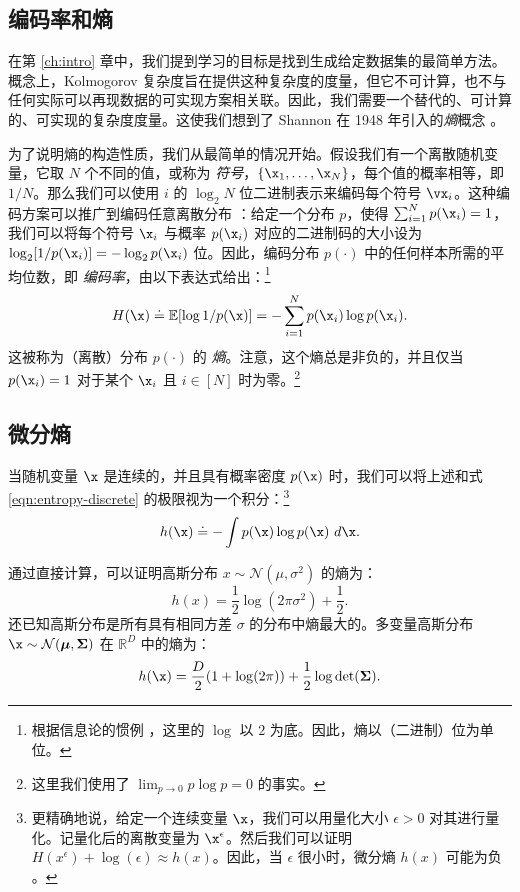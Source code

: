 \documentclass[../../book-main.tex]{subfiles}
\begin{document}
\subsection{编码率和熵}
在第 \ref{ch:intro} 章中，我们提到学习的目标是找到生成给定数据集的最简单方法。概念上，Kolmogorov 复杂度旨在提供这种复杂度的度量，但它不可计算，也不与任何实际可以再现数据的可实现方案相关联。因此，我们需要一个替代的、可计算的、可实现的复杂度度量。这使我们想到了 Shannon 在 1948 年引入的{\em 熵}概念 \cite{Shannon-1948}。

为了说明熵的构造性质，我们从最简单的情况开始。假设我们有一个离散随机变量，它取 $N$ 个不同的值，或称为 \textit{符号}，$\{\x_1, \ldots, \x_N\}$，每个值的概率相等，即 $1/N$。那么我们可以使用 $i$ 的 $\log_2 N$ 位二进制表示来编码每个符号 \(\vx_{i}\)。这种编码方案可以推广到编码任意离散分布 \cite{Cover-Thomas}：给定一个分布 \(p\)，使得 $\sum_{i=1}^N p(\x_i) = 1$，我们可以将每个符号 $\x_i$ 与概率 $p(\x_i)$ 对应的二进制码的大小设为 $\log_2 [1/p(\x_i)] = - \log_2 p(\x_i)$ 位。因此，编码分布 $p(\cdot)$ 中的任何样本所需的平均位数，即 \textit{编码率}，由以下表达式给出：\footnote{根据信息论的惯例 \cite{Cover-Thomas}，这里的 $\log$ 以 $2$ 为底。因此，熵以（二进制）位为单位。}
\begin{equation}
       H(\x) \doteq \mathbb{E}[\log 1/p(\x)]  = - \sum_{i=1}^N p(\x_i) \log  p(\x_i).
       \label{eqn:entropy-discrete}
\end{equation}
这被称为（离散）分布 $p(\cdot)$ 的 \textit{熵}。注意，这个熵总是非负的，并且仅当 $p(\x_i) = 1$ 对于某个 $\x_i$ 且 $i \in [N]$ 时为零。\footnote{这里我们使用了 $\lim_{p\rightarrow 0} p \log p = 0$ 的事实。}

\subsection{微分熵}

当随机变量 $\x$ 是连续的，并且具有概率密度 $p(\x)$ 时，我们可以将上述和式 \eqref{eqn:entropy-discrete} 的极限视为一个积分：\footnote{更精确地说，给定一个连续变量 $\x$，我们可以用量化大小 $\epsilon > 0$ 对其进行量化。记量化后的离散变量为 $\x^\epsilon$。然后我们可以证明 $H(x^\epsilon) + \log(\epsilon) \approx h(x)$。因此，当 $\epsilon$ 很小时，微分熵 $h(x)$ 可能为负 \cite{Cover-Thomas}。}
\begin{equation}
h(\x) \doteq  - \int p(\x) \log p(\x) ~d\x.
\label{eqn:entropy-differential}
\end{equation}

\begin{example}[高斯分布的熵]
通过直接计算，可以证明高斯分布 $x \sim \mathcal{N}(\mu, \sigma^2)$ 的熵为：
\begin{equation}
    h(x) = \frac{1}{2}\log (2\pi \sigma^2) + \frac{1}{2}.
    \label{eqn:entropy-Gaussian}
\end{equation}
还已知高斯分布是所有具有相同方差 $\sigma$ 的分布中熵最大的。多变量高斯分布 $\x \sim \mathcal{N}(\boldsymbol{\mu}, \boldsymbol{\Sigma})$ 在 $\mathbb{R}^D$ 中的熵为：
\begin{equation}
    h(\x) = \frac{D}{2}(1 + \log(2\pi)) + \frac{1}{2}\log\det(\boldsymbol{\Sigma}).
    \label{eqn:entropy-Gaussian-multi}
\end{equation}
\end{example}
\end{document}
